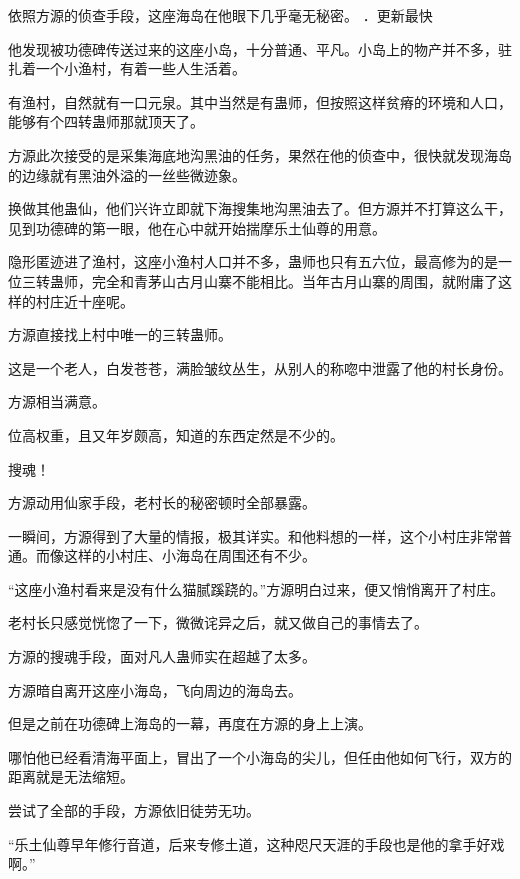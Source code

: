 
\begin{this_body}



依照方源的侦查手段，这座海岛在他眼下几乎毫无秘密。 ．更新最快

他发现被功德碑传送过来的这座小岛，十分普通、平凡。小岛上的物产并不多，驻扎着一个小渔村，有着一些人生活着。

有渔村，自然就有一口元泉。其中当然是有蛊师，但按照这样贫瘠的环境和人口，能够有个四转蛊师那就顶天了。

方源此次接受的是采集海底地沟黑油的任务，果然在他的侦查中，很快就发现海岛的边缘就有黑油外溢的一丝些微迹象。

换做其他蛊仙，他们兴许立即就下海搜集地沟黑油去了。但方源并不打算这么干，见到功德碑的第一眼，他在心中就开始揣摩乐土仙尊的用意。

隐形匿迹进了渔村，这座小渔村人口并不多，蛊师也只有五六位，最高修为的是一位三转蛊师，完全和青茅山古月山寨不能相比。当年古月山寨的周围，就附庸了这样的村庄近十座呢。

方源直接找上村中唯一的三转蛊师。

这是一个老人，白发苍苍，满脸皱纹丛生，从别人的称唿中泄露了他的村长身份。

方源相当满意。

位高权重，且又年岁颇高，知道的东西定然是不少的。

搜魂！

方源动用仙家手段，老村长的秘密顿时全部暴露。

一瞬间，方源得到了大量的情报，极其详实。和他料想的一样，这个小村庄非常普通。而像这样的小村庄、小海岛在周围还有不少。

“这座小渔村看来是没有什么猫腻蹊跷的。”方源明白过来，便又悄悄离开了村庄。

老村长只感觉恍惚了一下，微微诧异之后，就又做自己的事情去了。

方源的搜魂手段，面对凡人蛊师实在超越了太多。

方源暗自离开这座小海岛，飞向周边的海岛去。

但是之前在功德碑上海岛的一幕，再度在方源的身上上演。

哪怕他已经看清海平面上，冒出了一个小海岛的尖儿，但任由他如何飞行，双方的距离就是无法缩短。

尝试了全部的手段，方源依旧徒劳无功。

“乐土仙尊早年修行音道，后来专修土道，这种咫尺天涯的手段也是他的拿手好戏啊。”


\end{this_body}

